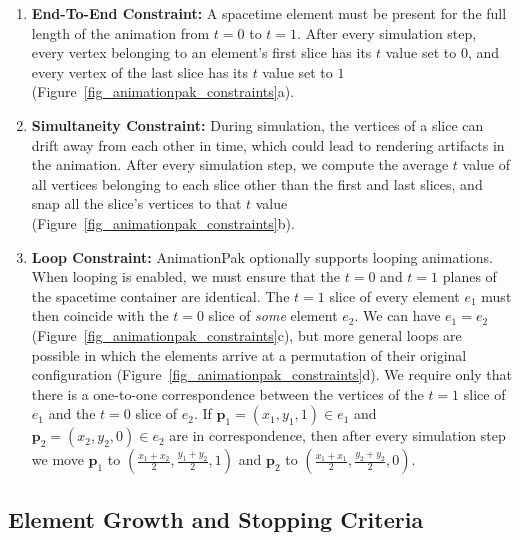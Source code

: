 \begin{enumerate}
\item \textbf{End-To-End Constraint:}
A spacetime element must be present for the full length of the animation
from $t=0$ to $t=1$.  After every simulation step, every vertex belonging
to an element's first slice has its $t$ value set to $0$, and every vertex
of the last slice has its $t$ value set to $1$
(Figure~\ref{fig_animationpak_constraints}a).

\item \textbf{Simultaneity Constraint:}
During simulation, the vertices of a slice can drift away from each
other in time, which could lead to rendering artifacts in the animation.
After every simulation step, we compute the average $t$ value of all
vertices belonging to each slice other than the first and last slices, and 
snap all the slice's vertices to that $t$ value 
(Figure~\ref{fig_animationpak_constraints}b).

\item \textbf{Loop Constraint:}
AnimationPak optionally supports looping animations.
When looping is enabled, we must ensure that the $t=0$ and $t=1$ planes
of the spacetime container are identical.  
The $t=1$ slice of every element $e_1$ must then 
coincide with the $t=0$ slice of \textit{some} 
element $e_2$.  We can have $e_1=e_2$ 
(Figure~\ref{fig_animationpak_constraints}c), but more general loops are possible in which
the elements arrive at a permutation of their original configuration
(Figure~\ref{fig_animationpak_constraints}d).  We require only that there is a one-to-one
correspondence between the vertices of the $t=1$ slice of $e_1$ and the
$t=0$ slice of $e_2$.  If $\bm{p}_1=(x_1,y_1,1)\in e_1$ and
$\bm{p}_2=(x_2,y_2,0)\in e_2$
are in correspondence, then after every simulation step we
move $\bm{p}_1$ to $(\frac{x_1+x_2}{2},\frac{y_1+y_2}{2},1)$ and
$\bm{p}_2$ to $(\frac{x_1+x_1}{2},\frac{y_2+y_2}{2},0)$.
\end{enumerate}


\subsection{Element Growth and Stopping Criteria}
\label{animationpak_element_growth_and_stopping_criteria}



